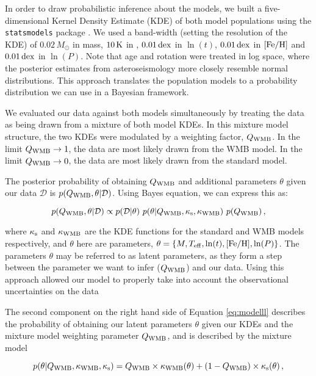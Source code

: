 In order to draw probabilistic inference about the models, we built a five-dimensional Kernel Density Estimate (KDE) of both model populations using the \texttt{statsmodels} package \cite{m_seabold+perktold2010}. We used a band-width (setting the resolution of the KDE) of $0.02\, M_\odot$ in mass, $10\, \rm K$ in \teff, $0.01\, \rm{dex}$ in $\ln(t)$, $0.01\, \rm{dex}$ in $\rm{[Fe/H]}$ and $0.01\, \rm{dex}$ in $\ln(P)$. Note that age and rotation were treated in log space, where the posterior estimates from asteroseismology more closely resemble normal distributions. This approach translates the population models to a probability distribution we can use in a Bayesian framework.

We evaluated our data against both models simultaneously by treating the data as being drawn from a mixture of both model KDEs. In this mixture model structure, the two KDEs were modulated by a weighting factor, $Q_{\rm WMB}$. In the limit $Q_{\rm WMB} \rightarrow 1$, the data are most likely drawn from the WMB model. In the limit $Q_{\rm WMB} \rightarrow 0$, the data are most likely drawn from the standard model.

The posterior probability of obtaining $Q_{\rm WMB}$ and additional parameters $\theta$ given our data $\mathcal{D}$ is $p(Q_{\rm{WMB}}, \theta | \mathcal{D})$. Using Bayes equation, we can express this as:

\begin{equation}\label{eq:modelll}
	p(Q_{\rm{WMB}}, \theta | \mathcal{D}) \propto p(\mathcal{D} | \theta)\ p(\theta | Q_{\rm{WMB}}, \kappa_{\rm{s}}, \kappa_{\rm{WMB}})\ p(Q_{\rm{WMB}})\, ,
\end{equation}

\noindent where $\kappa_{\rm{s}}$ and $\kappa_{\rm{WMB}}$ are the KDE functions for the standard and WMB models respectively, and $\theta$ here are parameters, $\theta = \{M, \mbox{$T_{\rm eff}$}, \ln(t), \mbox{$\rm{[Fe/H]}$}, \ln(P)\}$. The parameters $\theta$ may be referred to as latent parameters, as they form a step between the parameter we want to infer ($Q_{\rm{WMB}}$) and our data. Using this approach allowed our model to properly take into account the observational uncertainties on the data 

The second component on the right hand side of Equation \ref{eq:modelll} describes the probability of obtaining our latent parameters $\theta$ given our KDEs and the mixture model weighting parameter $Q_{\rm WMB}$, and is described by the mixture model

\begin{equation}\label{eq:mixturell}
	p(\theta | Q_{\rm{WMB}}, \kappa_{\rm{WMB}}, \kappa_{\rm{s}}) = Q_{\rm WMB} \times \kappa_{\rm WMB}(\theta) + (1 - Q_{\rm WMB}) \times \kappa_{\rm s}(\theta)\, ,
\end{equation}

